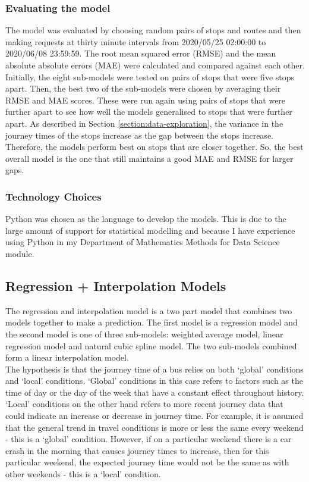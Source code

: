 \subsubsection{Evaluating the model}

The model was evaluated by choosing random pairs of stops and routes and then making requests at thirty minute intervals from 2020/05/25 02:00:00 to 2020/06/08 23:59:59. The root mean squared error (RMSE) and the mean absolute absolute errors (MAE) were calculated and compared against each other. \\

Initially, the eight sub-models were tested on pairs of stops that were five stops apart. Then, the best two of the sub-models were chosen by averaging their RMSE and MAE scores. These were run again using pairs of stops that were further apart to see how well the models generalised to stops that were further apart. As described in Section \ref{section:data-exploration}, the variance in the journey times of the stops increase as the gap between the stops increase. Therefore, the models perform best on stops that are closer together. So, the best overall model is the one that still maintains a good MAE and RMSE for larger gaps.

\subsubsection{Technology Choices}

Python was chosen as the language to develop the models. This is due to the large amount of support for statistical modelling and because I have experience using Python in my Department of Mathematics Methods for Data Science module.

\subsection{Regression + Interpolation Models}

The regression and interpolation model is a two part model that combines two models together to make a prediction. The first model is a regression model and the second model is one of three sub-models: weighted average model, linear regression model and natural cubic spline model. The two sub-models combined form a linear interpolation model. \\

The hypothesis is that the journey time of a bus relies on both `global' conditions and `local' conditions. `Global' conditions in this case refers to factors such as the time of day or the day of the week that have a constant effect throughout history. `Local' conditions on the other hand refers to more recent journey data that could indicate an increase or decrease in journey time. For example, it is assumed that the general trend in travel conditions is more or less the same every weekend - this is a `global' condition. However, if on a particular weekend there is a car crash in the morning that causes journey times to increase, then for this particular weekend, the expected journey time would not be the same as with other weekends - this is a `local' condition. \\ 

